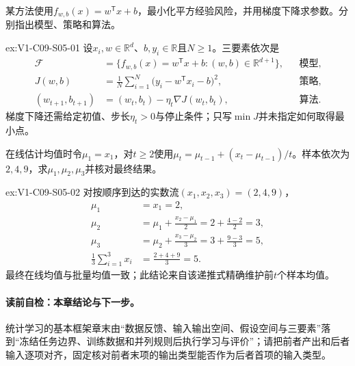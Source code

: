 \begin{SLChapterExercisePairSection}
\begin{exercise}[三要素辨认]\label{ex:V1-C09-S05-01}
某方法使用$f_{w,b}(x)=w^{\mathsf T}x+b$，最小化平方经验风险，并用梯度下降求参数。分别指出模型、策略和算法。
\end{exercise}
\label{sol:V1-C09-S05-01}
\begin{chapterexercisesolution}{ex:V1-C09-S05-01}
设$x_i,w\in\mathbb R^d$、$b,y_i\in\mathbb R$且$N\ge1$。三要素依次是
\[
\begin{aligned}
\mathcal F
  &=\{f_{w,b}(x)=w^{\mathsf T}x+b:(w,b)\in\mathbb R^{d+1}\},
  &&\text{模型},\\
J(w,b)
  &=\frac1N\sum_{i=1}^{N}
    \bigl(y_i-w^{\mathsf T}x_i-b\bigr)^2,
  &&\text{策略},\\
(w_{t+1},b_{t+1})
  &=(w_t,b_t)-\eta_t\nabla J(w_t,b_t),
  &&\text{算法}.
\end{aligned}
\]
梯度下降还需给定初值、步长$\eta_t>0$与停止条件；只写$\min J$并未指定如何取得最小点。
\end{chapterexercisesolution}

\begin{exercise}[在线均值更新]\label{ex:V1-C09-S05-02}
在线估计均值时令$\mu_1=x_1$，对$t\ge2$使用$\mu_t=\mu_{t-1}+(x_t-\mu_{t-1})/t$。样本依次为$2,4,9$，求$\mu_1,\mu_2,\mu_3$并核对最终结果。
\end{exercise}
\label{sol:V1-C09-S05-02}
\begin{chapterexercisesolution}{ex:V1-C09-S05-02}
对按顺序到达的实数流$(x_1,x_2,x_3)=(2,4,9)$，
\[
\begin{aligned}
\mu_1&=x_1=2,\\
\mu_2&=\mu_1+\frac{x_2-\mu_1}{2}
      =2+\frac{4-2}{2}=3,\\
\mu_3&=\mu_2+\frac{x_3-\mu_2}{3}
      =3+\frac{9-3}{3}=5,\\
\frac1{3}\sum_{i=1}^{3}x_i&=\frac{2+4+9}{3}=5.
\end{aligned}
\]
最终在线均值与批量均值一致；此结论来自该递推式精确维护前$t$个样本均值。
\end{chapterexercisesolution}

\end{SLChapterExercisePairSection}

\paragraph{读前自检：本章结论与下一步。}统计学习的基本框架章末由“数据反馈、输入输出空间、假设空间与三要素”落到“冻结任务边界、训练数据和并列规则后执行学习与评价”；请把前者产出和后者输入逐项对齐，固定核对前者末项的输出类型能否作为后者首项的输入类型。\par

